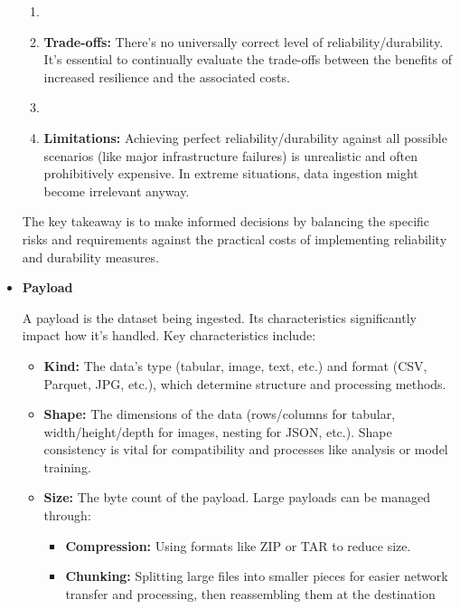 \begin{itemize}
\begin{enumerate}
        \item \item \textbf{Trade-offs:} There's no universally
        correct level of reliability/durability. It's essential to
        continually evaluate the trade-offs between the benefits of
        increased resilience and the associated costs.
        
        \item \item \textbf{Limitations:} Achieving perfect
        reliability/durability against all possible scenarios
        (like major infrastructure failures) is unrealistic and
        often prohibitively expensive. In extreme situations, data
        ingestion might become irrelevant anyway.
    \end{enumerate}

    The key takeaway is to make informed decisions by balancing the
    specific risks and requirements against the practical costs of
    implementing reliability and durability measures.

    \item \textbf{Payload}
    
    \noindent
    A payload is the dataset being ingested. Its characteristics
    significantly impact how it's handled. Key characteristics
    include:
    \begin{itemize}
        \item \textbf{Kind:} The data's type (tabular, image, text, etc.)
        and format (CSV, Parquet, JPG, etc.), which determine structure
        and processing methods.

        \item \textbf{Shape:} The dimensions of the data
        (rows/columns for tabular, width/height/depth for images,
        nesting for JSON, etc.). Shape consistency is vital for
        compatibility and processes like analysis or model training.

        \item \textbf{Size:} The byte count of the payload. Large
        payloads can be managed through:
        \begin{itemize}
            \item \textbf{Compression:} Using formats like ZIP or
            TAR to reduce size.
            
            \item \textbf{Chunking:} Splitting large files into
            smaller pieces for easier network transfer and
            processing, then reassembling them at the destination
        \end{itemize}


\end{itemize}
\end{itemize}
